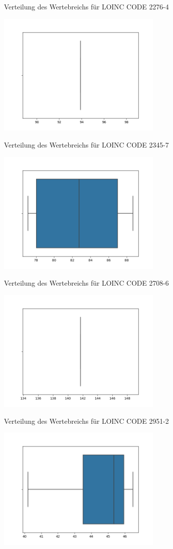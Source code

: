 \documentclass[12pt,a4paper,toc=bibliographynumbered,toc=indenttextentries]{scrreprt}
\begin{document}
\begin{center}
			\small{Verteilung des Wertebreichs für LOINC CODE 2276-4}
			
			\includegraphics[width=8cm]{Graphs/2345-7.png}
			
			\small{Verteilung des Wertebreichs für LOINC CODE 2345-7}
			
			\includegraphics[width=8cm]{Graphs/2708-6.png}
			
			\small{Verteilung des Wertebreichs für LOINC CODE 2708-6}
			
			\includegraphics[width=8cm]{Graphs/2951-2.png}
			
			\small{Verteilung des Wertebreichs für LOINC CODE 2951-2}
			
			\includegraphics[width=8cm]{Graphs/4544-3.png}
			

\end{center}
\end{document}
